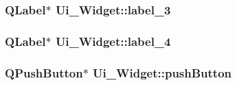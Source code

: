 \subsubsection[{\texorpdfstring{label\_3}{label_3}}]{\setlength{\rightskip}{0pt plus 5cm}QLabel$\ast$ Ui\_Widget::label\_3}\hypertarget{class_ui___widget_adfcab5569ac08da197e14dba01390755}{}\label{class_ui___widget_adfcab5569ac08da197e14dba01390755}
\subsubsection[{\texorpdfstring{label\_4}{label_4}}]{\setlength{\rightskip}{0pt plus 5cm}QLabel$\ast$ Ui\_Widget::label\_4}\hypertarget{class_ui___widget_a7d22bf9c5cf51754b1c145db5ca0da79}{}\label{class_ui___widget_a7d22bf9c5cf51754b1c145db5ca0da79}
\subsubsection[{\texorpdfstring{pushButton}{pushButton}}]{\setlength{\rightskip}{0pt plus 5cm}QPushButton$\ast$ Ui\_Widget::pushButton}\hypertarget{class_ui___widget_a7dcf5da8902069415662905e93b0d5cb}{}\label{class_ui___widget_a7dcf5da8902069415662905e93b0d5cb}
